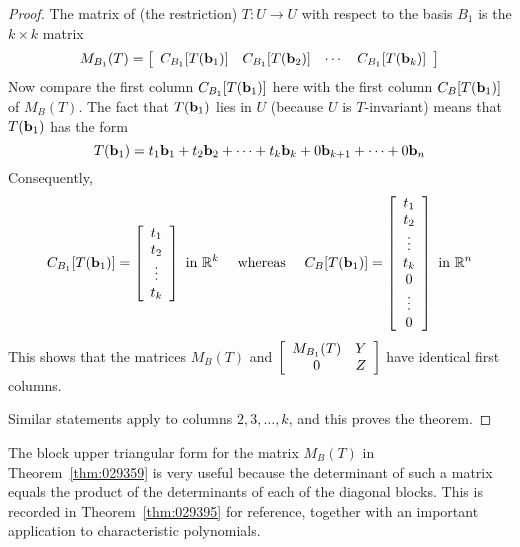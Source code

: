 \begin{proof}
The matrix of (the restriction) $T : U \to U$ with respect to the basis $B_{1}$ is the $k \times k$ matrix
\begin{equation*}
M_{B_1}(T) = \left[ \begin{array}{cccc} C_{B_1}[T(\textbf{b}_1)] & C_{B_1}[T(\textbf{b}_2)] & \cdots & C_{B_1}[T(\textbf{b}_k)] \end{array} \right]
\end{equation*}
Now compare the first column $C_{B_1}[T(\textbf{b}_1)]$ here with the first column $C_{B}[T(\textbf{b}_{1})]$ of $M_{B}(T)$. The fact that $T(\textbf{b}_{1})$ lies in $U$ (because $U$ is $T$-invariant) means that $T(\textbf{b}_{1})$ has the form
\begin{equation*}
T(\textbf{b}_1) = t_1\textbf{b}_1 + t_2\textbf{b}_2 + \cdots + t_k\textbf{b}_k + 0\textbf{b}_{k+1} + \cdots + 0\textbf{b}_n
\end{equation*}
Consequently,
\begin{equation*}
C_{B_1}[T(\textbf{b}_1)] = \left[ \begin{array}{c} t_1 \\ t_2 \\ \vdots \\ t_k \end{array} \right] \mbox{ in } \mathbb{R}^k \quad \mbox{ whereas } \quad C_B[T(\textbf{b}_1)] = \left[ \begin{array}{c} t_1 \\ t_2 \\ \vdots \\ t_k  \\ 0 \\ \vdots \\ 0 \end{array} \right] \mbox{ in } \mathbb{R}^n
\end{equation*}
This shows that the matrices $M_{B}(T)$ and $\left[ \begin{array}{cc} M_{B_1}(T) & Y \\ 0 & Z \end{array} \right]$ have identical first columns.


Similar statements apply to columns $2, 3, \dots, k$, and this proves the theorem.
\end{proof}

The block upper triangular form for the matrix $M_{B}(T)$ in Theorem~\ref{thm:029359} is very useful because the determinant of such a matrix equals the product of the determinants of each of the diagonal blocks. This is recorded in Theorem~\ref{thm:029395} for reference, together with an important application to characteristic polynomials.


